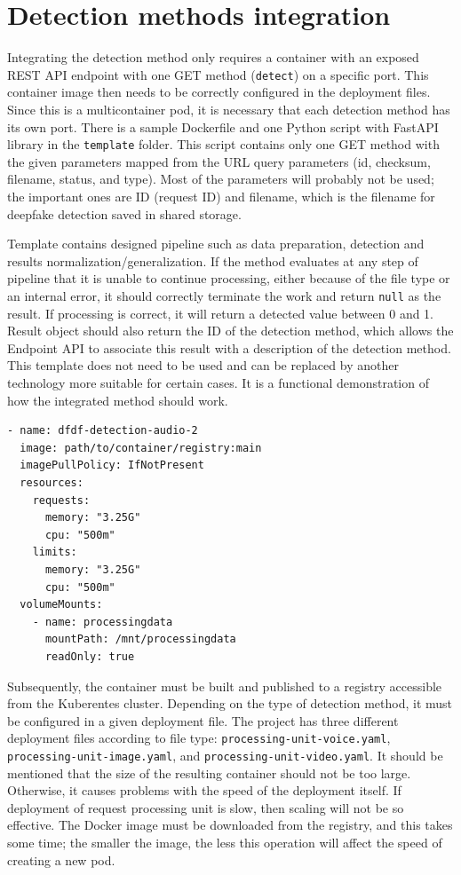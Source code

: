 \chapter{Detection methods integration}

Integrating the detection method only requires a container with an exposed REST API endpoint with one GET method (\texttt{detect}) on a specific port. This container image then needs to be correctly configured in the deployment files. Since this is a multicontainer pod, it is necessary that each detection method has its own port. There is a sample Dockerfile and one Python script with FastAPI library in the \texttt{template} folder. This script contains only one GET method with the given parameters mapped from the URL query parameters (id, checksum, filename, status, and type). Most of the parameters will probably not be used; the important ones are ID (request ID) and filename, which is the filename for deepfake detection saved in shared storage.

Template contains designed pipeline such as data preparation, detection and results normalization/generalization. If the method evaluates at any step of pipeline that it is unable to continue processing, either because of the file type or an internal error, it should correctly terminate the work and return \texttt{null} as the result. If processing is correct, it will return a detected value between 0 and 1. Result object should also return the ID of the detection method, which allows the Endpoint API to associate this result with a description of the detection method. This template does not need to be used and can be replaced by another technology more suitable for certain cases. It is a functional demonstration of how the integrated method should work.

\begin{lstlisting}[caption={Container configuration in Kubernates manifest},label={list:detection_method_manifest}]
- name: dfdf-detection-audio-2
  image: path/to/container/registry:main
  imagePullPolicy: IfNotPresent
  resources:
    requests:
      memory: "3.25G"
      cpu: "500m"
    limits:
      memory: "3.25G"
      cpu: "500m"
  volumeMounts:
    - name: processingdata
      mountPath: /mnt/processingdata
      readOnly: true
\end{lstlisting}

Subsequently, the container must be built and published to a registry accessible from the Kuberentes cluster. Depending on the type of detection method, it must be configured in a given deployment file. The project has three different deployment files according to file type: \texttt{processing-unit-voice.yaml}, \texttt{processing-unit-image.yaml}, and \texttt{processing-unit-video.yaml}. It should be mentioned that the size of the resulting container should not be too large. Otherwise, it causes problems with the speed of the deployment itself. If deployment of request processing unit is slow, then scaling will not be so effective. The Docker image must be downloaded from the registry, and this takes some time; the smaller the image, the less this operation will affect the speed of creating a new pod.

